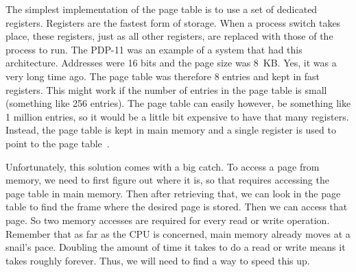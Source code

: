 The simplest implementation of the page table is to use a set of dedicated registers. Registers are the fastest form of storage. When a process switch takes place, these registers, just as all other registers, are replaced with those of the process to run. The PDP-11 was an example of a system that had this architecture. Addresses were 16 bits and the page size was 8~KB. Yes, it was a very long time ago. The page table was therefore 8 entries and kept in fast registers. This might work if the number of entries in the page table is small (something like 256 entries). The page table can easily however, be something like 1 million entries, so it would be a little bit expensive to have that many registers. Instead, the page table is kept in main memory and a single register is used to point to the page table~\cite{osc}.

Unfortunately, this solution comes with a big catch. To access a page from memory, we need to first figure out where it is, so that requires accessing the page table in main memory. Then after retrieving that, we can look in the page table to find the frame where the desired page is stored. Then we can access that page. So two memory accesses are required for every read or write operation. Remember that as far as the CPU is concerned, main memory already moves at a snail's pace. Doubling the amount of time it takes to do a read or write means it takes roughly forever. Thus, we will need to find a way to speed this up.



